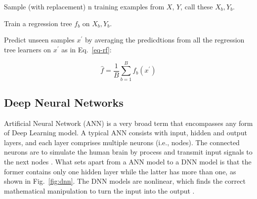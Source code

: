 \noindent
\begin{myenumerate}
  \item Sample (with replacement) n training examples from $X$, $Y$, call these $X_b, Y_b$.
  \item Train a regression tree $f_b$ on $X_b, Y_b$.
  \item Predict unseen samples $x^{'}$ by averaging the predicdtions from all the regression tree learners on $x^{'}$ as in Eq.~\ref{eq-rf}:
\end{myenumerate}

\begin{equation}\label{eq-rf}
  \hat{f}=\frac{1}{B}\sum_{b=1}^{B}f_b(x^{'})
\end{equation}

\subsection{Deep Neural Networks}
Artificial Neural Network (ANN) is a very broad term that encompasses any form of Deep Learning model. A typical ANN consists with input, hidden and output layers, and each layer comprises multiple neurons (i.e., nodes). The connected neurons are to simulate the human brain by process and transmit input signals to the next nodes \citep{mohseni-dargahChapter12Machine2022} . What sets apart from a ANN model to a DNN model is that the former contains only one hidden layer while the latter has more than one, as shown in Fig.~\ref{fig:dnn}. The DNN models are nonlinear, which finds the correct mathematical manipulation to turn the input into the output \citep{bangaloreaiDeepNeuralNetwork2018}.

